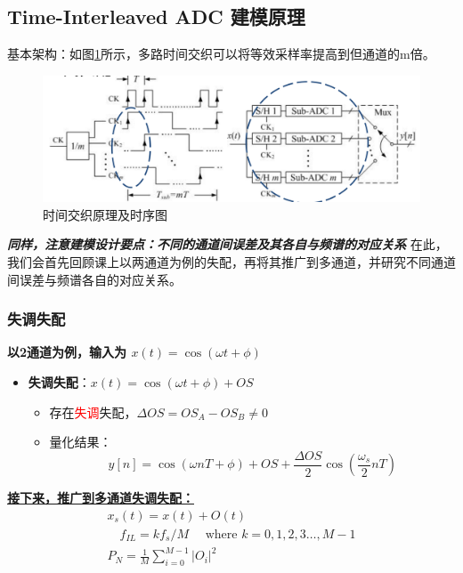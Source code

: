 \documentclass[cs4size,a4paper]{ctexart}
\numberwithin{equation}{section}
\numberwithin{table}{section}
\numberwithin{figure}{section}
\begin{document}
    \subsection{Time-Interleaved ADC 建模原理}
		基本架构：如图\ref{fig:circuit3}所示，多路时间交织可以将等效采样率提高到但通道的m倍。
		\begin{figure}[H]
			\centering
			\includegraphics[width=1\textwidth]{figure/circuit3.png}
			\caption{时间交织原理及时序图} \label{fig:circuit3}
		\end{figure}
		\noindent
		\textbf{\textit{同样，注意建模设计要点：不同的通道间误差及其各自与频谱的对应关系}}
		在此，我们会首先回顾课上以两通道为例的失配，再将其推广到多通道，并研究不同通道间误差与频谱各自的对应关系。

		\subsubsection{失调失配}
		\textbf{以2通道为例，输入为 $x(t) = \cos(\omega t + \phi)$}
		\begin{itemize}
			\item \textbf{失调失配}：$x(t) = \cos(\omega t + \phi) + OS$
			\begin{itemize}
				\item 存在\textcolor{red}{失调}失配，$\Delta OS = OS_A - OS_B \neq 0$
				\item 量化结果：
				\[
				y[n] = \cos(\omega nT + \phi) + OS + \frac{\Delta OS}{2} \cos\left(\frac{\omega_s}{2} nT \right)
				\]
			\end{itemize}
		\end{itemize}
		\underline{\textbf{接下来，推广到多通道失调失配：}}
		\begin{equation}
			\begin{gathered}
				x_s(t)=x(t)+O(t)\\
				 \quad f_{I L}=k f_s / M \quad \text { where } k=0,1,2,3 \ldots, M-1 \\
				P_N=\frac{1}{M} \sum_{i=0}^{M-1}\left|O_i\right|^2
			\end{gathered}
		\end{equation}
		
\end{document}
